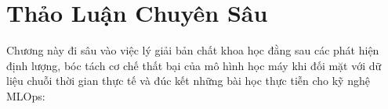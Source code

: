 
\chapter{Thảo Luận Chuyên Sâu}
\label{chap:thao_luan}

Chương này đi sâu vào việc lý giải bản chất khoa học đằng sau các phát hiện định lượng, bóc tách cơ chế thất bại của mô hình học máy khi đối mặt với dữ liệu chuỗi thời gian thực tế và đúc kết những bài học thực tiễn cho kỹ nghệ MLOps:




